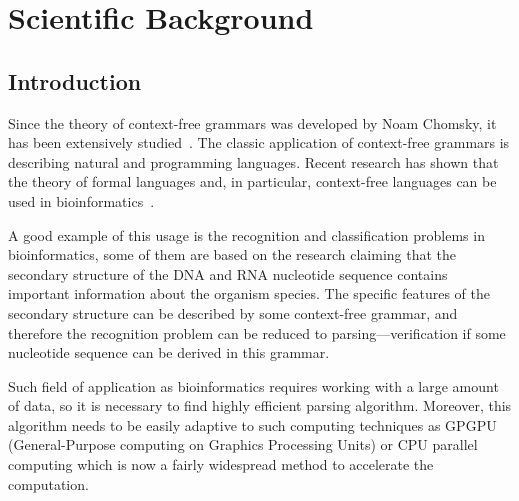 \section{\bf Scientific Background}

\subsection{Introduction}

Since the theory of context-free grammars was developed by Noam Chomsky, it has been extensively studied~\cite{chomsky1959certain,chomsky1963algebraic}. The classic application of context-free grammars is describing natural and programming  languages. Recent  research has  shown  that the theory of formal languages and, in particular, context-free languages can be used in bioinformatics~\cite{rivas,knudsen,yuan,dowell}.

A good example of this usage is the recognition and classification problems in bioinformatics, some of them are based on the research claiming that the secondary structure of the DNA and RNA nucleotide sequence contains important information about the organism species. The specific features of the secondary structure can be described by some context-free grammar, and therefore the recognition problem can be reduced to parsing---verification if some nucleotide sequence can be derived in this grammar.

Such field of application as bioinformatics requires working with a large amount of data, so it is necessary to find highly efficient parsing algorithm. Moreover, this algorithm needs to be easily adaptive to such computing techniques as GPGPU (General-Purpose computing on Graphics Processing Units) or CPU parallel computing which is now a fairly widespread method to accelerate the computation.

